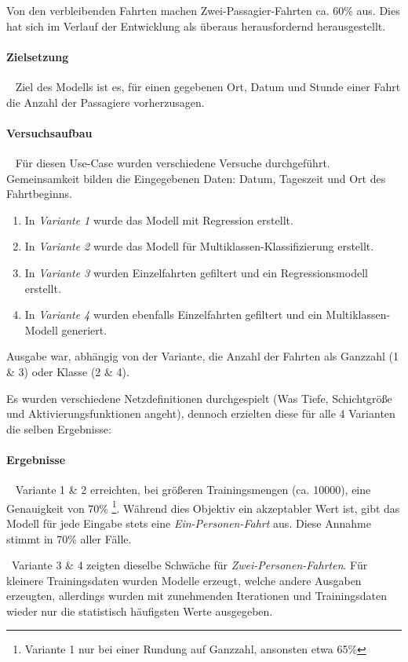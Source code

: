 Von den verbleibenden Fahrten machen Zwei-Passagier-Fahrten ca. 60\% aus.  Dies hat sich im Verlauf der Entwicklung als überaus herausfordernd herausgestellt. 
\paragraph{Zielsetzung} ~\newline
Ziel des Modells ist es, für einen gegebenen Ort, Datum und Stunde einer Fahrt die Anzahl der Passagiere vorherzusagen. 
 
\paragraph{Versuchsaufbau} ~\newline
Für diesen Use-Case wurden verschiedene Versuche durchgeführt. Gemeinsamkeit bilden die Eingegebenen Daten: Datum, Tageszeit und Ort des Fahrtbeginns. 
\begin{enumerate}
	\item In \textit{Variante 1} wurde das Modell mit Regression erstellt. 
	\item In \textit{Variante 2} wurde das Modell für Multiklassen-Klassifizierung erstellt.
	\item In \textit{Variante 3} wurden Einzelfahrten gefiltert und ein Regressionsmodell erstellt. 
	\item In \textit{Variante 4} wurden ebenfalls Einzelfahrten gefiltert und ein Multiklassen-Modell generiert. 
\end{enumerate}
Ausgabe war, abhängig von der Variante, die Anzahl der Fahrten als Ganzzahl (1 \& 3) oder Klasse (2 \& 4). 

Es wurden verschiedene Netzdefinitionen durchgespielt (Was Tiefe, Schichtgröße und Aktivierungsfunktionen angeht), dennoch erzielten diese für alle 4 Varianten die selben Ergebnisse:
\paragraph{Ergebnisse} ~\newline
Variante 1 \& 2 erreichten, bei größeren Trainingsmengen (ca. 10000), eine Genauigkeit von 70\% \footnote{Variante 1 nur bei einer Rundung auf Ganzzahl, ansonsten etwa 65\%}. Während dies Objektiv ein akzeptabler Wert ist, gibt das Modell für jede Eingabe stets eine \textit{Ein-Personen-Fahrt} aus. Diese Annahme stimmt in 70\% aller Fälle. 

~\newline Variante 3 \& 4 zeigten dieselbe Schwäche für \textit{Zwei-Personen-Fahrten}. Für kleinere Trainingsdaten wurden Modelle erzeugt, welche andere Ausgaben erzeugten, allerdings wurden mit zunehmenden Iterationen und Trainingsdaten wieder nur die statistisch häufigsten Werte ausgegeben. 

